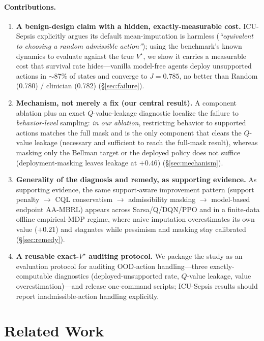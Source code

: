 \documentclass{article}
\begin{document}
\paragraph{Contributions.}
\begin{enumerate}[leftmargin=2em,itemsep=2pt,topsep=2pt]
  \item \textbf{A benign-design claim with a hidden, exactly-measurable cost.}
  ICU-Sepsis explicitly argues its default mean-imputation is harmless
  (\emph{``equivalent to choosing a random admissible action''}); using the
  benchmark's known dynamics to evaluate against the true $V^\star$, we show it
  carries a measurable cost that survival rate hides---vanilla model-free agents
  deploy unsupported actions in $\sim$87\% of states and converge to $J{=}0.785$,
  no better than Random (0.780) / clinician (0.782) (\S\ref{sec:failure}).
  \item \textbf{Mechanism, not merely a fix (our central result).} A component
  ablation plus an exact $Q$-value-leakage diagnostic localize the failure to
  \emph{behavior-level} sampling: \emph{in our ablation}, restricting behavior to
  supported actions matches the full mask and is the only component that clears the
  $Q$-value leakage (necessary and sufficient to reach the full-mask result),
  whereas masking only the Bellman target or the deployed policy does not suffice
  (deployment-masking leaves leakage at $+0.46$)
  (\S\ref{sec:mechanism}).
  \item \textbf{Generality of the diagnosis and remedy, as supporting evidence.}
  As supporting evidence, the same support-aware improvement pattern (support
  penalty $\to$ CQL conservatism $\to$ admissibility masking $\to$ model-based
  endpoint AA-MBRL) appears across Sarsa/Q/DQN/PPO and in a finite-data offline
  empirical-MDP regime,
  where naive imputation overestimates its own value ($+0.21$) and stagnates
  while pessimism and masking stay calibrated (\S\ref{sec:remedy}).
  \item \textbf{A reusable exact-$V^\star$ auditing protocol.} We package the
  study as an evaluation protocol for auditing OOD-action handling---three
  exactly-computable diagnostics (deployed-unsupported rate, $Q$-value leakage,
  value overestimation)---and release one-command scripts; ICU-Sepsis results
  should report inadmissible-action handling explicitly.
\end{enumerate}

\section{Related Work}
\label{sec:related}
\end{document}
